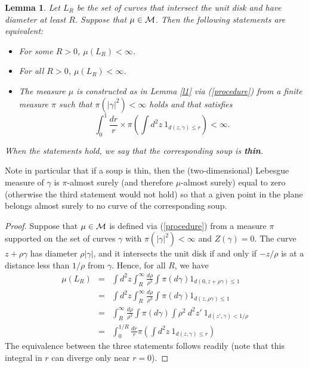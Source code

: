 \documentclass[11pt]{article}
\newtheorem {lemma} [Theorem]    {Lemma}
\begin{document}
\begin{lemma}\label{mu_cross}
Let $L_R$ be the set of curves that intersect the unit disk
and have diameter at least $R$. Suppose that $\mu \in {\cal M}$. 
Then the following statements are equivalent:
\begin {itemize}
\item
For some $R> 0$, $\mu(L_R) < \infty$.
\item
For all $R> 0$, $\mu (L_R) < \infty$.
\item 
The measure $\mu$ is constructed as in Lemma \ref {l1} via (\ref {procedure}) from a finite measure $\pi$ 
such that $\pi ( |\gamma|^2) < \infty$ holds and that satisfies
$$ \int_0^1 \frac {dr}{r}  \times \pi ( \int d^2 z \ 1_{d ( z, \gamma) \le r })  < \infty.$$ 
\end {itemize}
When the statements hold, we say that the corresponding soup is {\bf thin}.
\end {lemma}

Note in particular 
that if a soup is thin, then the (two-dimensional) Lebesgue measure of $\gamma$ is $\pi$-almost surely (and therefore $\mu$-almost surely)
equal to zero (otherwise the third statement would not hold) 
so that a given point in the plane belongs almost surely to no curve of the corresponding soup. 

\begin{proof}
Suppose that $\mu \in {\cal M}$ is defined via (\ref {procedure}) 
from a measure $\pi$ supported on the set of curves $\gamma$ 
with $\pi ( |\gamma|^2) < \infty$ and $Z ( \gamma)= 0$.
The curve
$z + \rho \gamma$ has diameter $\rho |\gamma|$, and it intersects
the unit disk if and only if  $-z / \rho$ is at a distance less than $1/\rho$
from $\gamma$. Hence, for all $R$, we have
\begin{eqnarray*}
\mu(L_R) 
& = & \int d^2 z \int_R^\infty \frac {d \rho}{\rho^3} \int \pi ( d \gamma) 1_{ d(0, z+ \rho \gamma) \le 1 } \\
& = & \int d^2 z \int_R^\infty \frac {d \rho}{\rho^3} \int \pi ( d \gamma) 1_{ d(z, \rho \gamma) \le 1 } \\
& = & \int_R^\infty  \frac {d \rho}{\rho^3} \int \pi ( d \gamma)  \int\rho^2 \   d^2 z' \  1_{ d(z' , \gamma) < 1/ \rho } \\
& = & \int_0^{1/R} \frac {dr}{r} \pi ( \int d^2 z \ 1_{ d (z,\gamma) \le r } ) 
\end{eqnarray*}
The equivalence between the three statements follows readily 
(note that this integral in $r$ can diverge only near $r=0$).
\end {proof}
\end{document}
